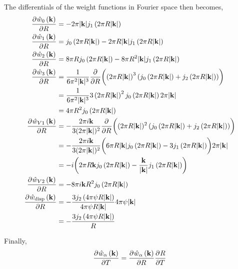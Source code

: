 \documentclass[12pt, letterpaper]{article}
\newcommand*{\pd}[3][]{\frac{\partial^{#1}#2}{\partial{#3}^{#1}}}%
\newcommand*{\lb}{\ensuremath{\left(}}
\newcommand*{\rb}{\ensuremath{\right)}}
\begin{document}
The differentials of the weight functions in Fourier space then becomes,
\begin{align}
  \label{eq:weight_functions_fourier_diff}
  \pd{\hat{w}_0 \lb \mathbf{k}\rb}{R} &= - 2 \pi |\mathbf{k}| j_1\lb 2 \pi R |\mathbf{k}| \rb  \\
  \pd{\hat{w}_1 \lb \mathbf{k}\rb}{R} &= j_0\lb 2 \pi R |\mathbf{k}| \rb - 2 \pi R |\mathbf{k}| j_1\lb 2 \pi R |\mathbf{k}| \rb \\
  \pd{\hat{w}_2 \lb \mathbf{k}\rb}{R} &= 8 \pi R j_0\lb 2 \pi R |\mathbf{k}| \rb - 8 \pi R^2 |\mathbf{k}| j_1\lb 2 \pi R |\mathbf{k}| \rb  \\
  \pd{\hat{w}_3 \lb \mathbf{k}\rb}{R}  &=  \frac{1}{6 \pi^2 |\mathbf{k}|^3} \pd{}{R}\biggl( \lb 2 \pi R |\mathbf{k}|\rb ^3 \lb j_0\lb 2 \pi R |\mathbf{k}| \rb + j_2\lb 2 \pi R |\mathbf{k}| \rb \rb \biggr)  \nonumber \\
                                      &=  \frac{1}{6 \pi^2 |\mathbf{k}|^3} 3 \lb 2 \pi R |\mathbf{k}|\rb ^2  j_0\lb 2 \pi R |\mathbf{k}| \rb 2 \pi |\mathbf{k}| \nonumber  \\
                                      &=  4 \pi R^2 j_0\lb 2 \pi R |\mathbf{k}| \rb  \\
  \pd{\hat{w}_{V1} \lb \mathbf{k}\rb}{R} &= - \frac{2 \pi i \mathbf{k}}{3 (2 \pi |\mathbf{k}|)^2}  \pd{}{R}\biggl( (2 \pi R |\mathbf{k}|)^2 \lb j_0\lb 2 \pi R |\mathbf{k}| \rb + j_2\lb 2 \pi R |\mathbf{k}| \rb \rb \biggr) \nonumber \\
                                      &= - \frac{2 \pi i \mathbf{k}}{3 (2 \pi |\mathbf{k}|)^2} \biggl( 6 \pi R |\mathbf{k}| j_0\lb 2 \pi R |\mathbf{k}| \rb - 3 j_1\lb 2 \pi R |\mathbf{k}| \rb \biggr) 2 \pi |\mathbf{k}|  \nonumber \\
   &= - i \biggl( 2 \pi R \mathbf{k} j_0\lb 2 \pi R |\mathbf{k}| \rb - \frac{\mathbf{k}}{|\mathbf{k}|} j_1\lb 2 \pi R |\mathbf{k}| \rb \biggr)  \\
  \pd{\hat{w}_{V2} \lb \mathbf{k}\rb}{R} &= - 8 \pi i \mathbf{k} R^2 j_0\lb 2 \pi R |\mathbf{k}| \rb  \\
  \pd{\hat{w}_{\rm{disp}} \lb \mathbf{k}\rb}{R} &= -\frac{3 j_2\lb 4 \pi \psi R |\mathbf{k}| \rb}{4 \pi \psi R |\mathbf{k}|} 4 \pi \psi |\mathbf{k}| \nonumber \\
                                      &= -\frac{3 j_2\lb 4 \pi \psi R |\mathbf{k}| \rb}{R}
\end{align}

Finally,
\begin{equation}
  \pd{\hat{w}_\alpha \lb \mathbf{k}\rb}{T} = \pd{\hat{w}_\alpha \lb \mathbf{k}\rb}{R} \pd{R}{T}
\end{equation}
\end{document}

